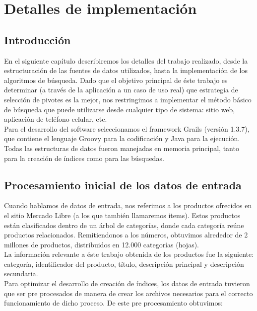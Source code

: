 \chapter{Detalles de implementaci\'on}

\section{Introducci\'on}

En el siguiente cap\'itulo describiremos los detalles del trabajo realizado, desde la estructuraci\'on de las fuentes de datos utilizados, hasta la implementaci\'on de los algoritmos de b\'usqueda. Dado que el objetivo principal de \'este trabajo es determinar (a trav\'es de la aplicaci\'on a un caso de uso real) que estrategia de selecci\'on de pivotes es la mejor, nos restringimos a implementar el m\'etodo b\'asico de b\'usqueda que puede utilizarse desde cualquier tipo de sistema: sitio web, aplicaci\'on de tel\'efono celular, etc.\\

Para el desarrollo del software seleccionamos el framework Grails (versi\'on 1.3.7), que contiene el lenguaje Groovy para la codificaci\'on y Java para la ejecuci\'on.\\

Todas las estructuras de datos fueron manejadas en memoria principal, tanto para la creaci\'on de \'indices como para las b\'usquedas.


\section{Procesamiento inicial de los datos de entrada} \label{proc-inic}

Cuando hablamos de datos de entrada, nos referimos a los productos ofrecidos en el sitio Mercado Libre (a los que tambi\'en llamaremos items). Estos productos est\'an clasificados dentro de un \'arbol de categor\'ias, donde cada categor\'ia re\'une productos relacionados. Remitiendonos a los n\'umeros, obtuvimos alrededor de 2 millones de productos, distribuidos en 12.000 categor\'ias (hojas).\\

La informaci\'on relevante a \'este trabajo obtenida de los productos fue la siguiente: categor\'ia, identificador del producto, t\'itulo, descripci\'on principal y descripci\'on secundaria.\\

Para optimizar el desarrollo de creaci\'on de \'indices, los datos de entrada tuvieron que ser pre procesados de manera de crear los archivos necesarios para el correcto funcionamiento de dicho proceso. De este pre procesamiento obtuvimos:

